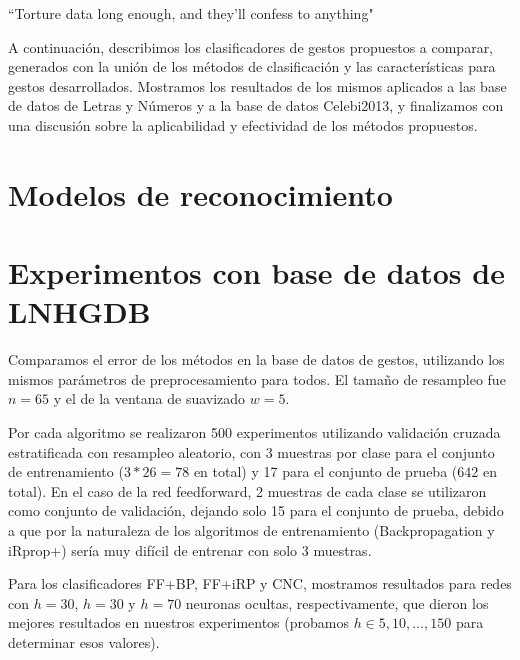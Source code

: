 \epigraph{``Torture data long enough, and they'll confess to anything"}{}

A continuación, describimos los clasificadores de gestos propuestos a comparar, generados con la unión de los métodos de clasificación y las características para gestos desarrollados. Mostramos los resultados de los mismos aplicados a las base de datos de Letras y Números y a la base de datos Celebi2013, y finalizamos con una discusión sobre la aplicabilidad y efectividad de los métodos propuestos.

\section{Modelos de reconocimiento }

\section{Experimentos con base de datos de LNHGDB}

Comparamos el error de los métodos en la base de datos de gestos, utilizando los mismos parámetros de preprocesamiento para todos. El tamaño de resampleo fue $n=65$ y el de la ventana de suavizado $w=5$.

Por cada algoritmo se realizaron 500 experimentos utilizando validación cruzada estratificada con resampleo aleatorio, con 3 muestras por clase para el conjunto de entrenamiento ($3*26=78$ en total) y 17 para el conjunto de prueba ($642$ en total). En el caso de la red feedforward, 2 muestras de cada clase se utilizaron como conjunto de validación, dejando solo 15 para el conjunto de prueba, debido a que por la naturaleza de los algoritmos de entrenamiento (Backpropagation y iRprop+) sería muy difícil de entrenar con solo 3 muestras.

Para los clasificadores FF+BP, FF+iRP y CNC, mostramos resultados para redes con $h=30$, $h=30$ y $h=70$ neuronas ocultas, respectivamente, que dieron los mejores resultados en nuestros experimentos (probamos $h \in {5,10,\dots,150} $ para determinar esos valores).

